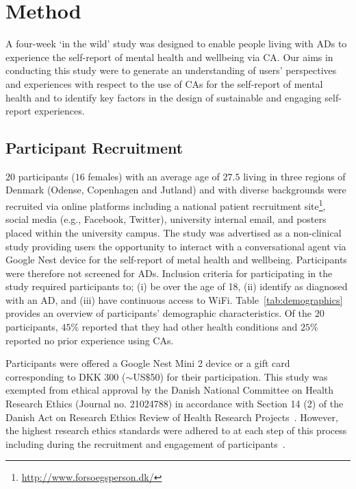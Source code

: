\section{Method}
    
    A four-week `in the wild' study was designed to enable people living with \ac{AD}s to experience the self-report of mental health and wellbeing via \ac{CA}. Our aims in conducting this study were to generate an understanding of users' perspectives and experiences with respect to the use of \ac{CA}s for the self-report of mental health and to identify key factors in the design of sustainable and engaging self-report experiences.
    
    \subsection{Participant Recruitment}
    
        $20$ participants ($16$ females) with an average age of $27.5$ living in three regions of Denmark (Odense, Copenhagen and Jutland) and with diverse backgrounds were recruited via online platforms including a national patient recruitment site\footnote{\url{http://www.forsoegsperson.dk/}}, social media (e.g., Facebook, Twitter), university internal email, and posters placed within the university campus. The study was advertised as a non-clinical study providing users the opportunity to interact with a conversational agent via Google Nest device for the self-report of metal health and wellbeing. Participants were therefore not screened for \ac{AD}s. Inclusion criteria for participating in the study required participants to; (i) be over the age of 18, (ii) identify as diagnosed with an \acf{AD}, and (iii) have continuous access to WiFi. Table~\ref{tab:demographics} provides an overview of participants' demographic characteristics. Of the $20$ participants, $45\%$ reported that they had other health conditions and $25\%$ reported no prior experience using \ac{CA}s.
        
        
        
        Participants were offered a Google Nest Mini 2 device or a gift card corresponding to DKK $300$ ($\sim$US$\$ $50) for their participation. This study was exempted from ethical approval by the Danish National Committee on Health Research Ethics (Journal no. 21024788) in accordance with Section 14 (2) of the Danish Act on Research Ethics Review of Health Research Projects~\cite{NVK_guideline}. However, the highest research ethics standards were adhered to at each step of this process including during the recruitment and engagement of participants~\cite{NVK_guideline}.
        
